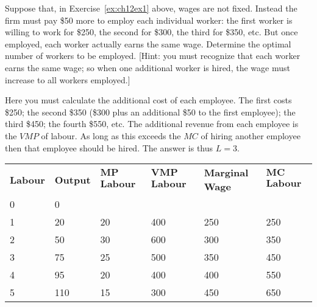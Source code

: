 \begin{enumialphparenastyle}
\begin{ex}\label{ex:ch12ex3}
Suppose that, in Exercise~\ref{ex:ch12ex1} above, wages are not fixed. Instead the firm must pay \$50 more to employ each individual worker: the first worker is willing to work for \$250, the second for \$300, the third for \$350, etc. But once employed, each worker actually earns the same wage.  Determine the optimal number of workers to be employed. [Hint: you must recognize that each worker earns the same wage; so when one additional worker is hired, the wage must increase to all workers employed.]
\begin{sol}
	Here you must calculate the additional cost of each employee. The first costs \$250; the second \$350 (\$300 plus an additional \$50 to the first employee); the third \$450; the fourth \$550, etc. The additional revenue from each employee is the $VMP$ of labour. As long as this exceeds the $MC$ of hiring another employee then that employee should be hired. The answer is thus $L=3$.
	\begin{center}
	\begin{tabu} to \linewidth {|X[0.5,c]X[0.5,c]X[0.8,c]X[1,c]X[1,c]X[1,c]|}	\hline
		\textbf{Labour}	&	\textbf{Output}	&	\textbf{$\mathbf{MP}$ Labour}	&	\textbf{$\mathbf{VMP}$ Labour}	&	\textbf{Marginal Wage}	&	\textbf{$\mathbf{MC}$ Labour}	\\
		0	&	0	&	&	&	&	\\
		1	&	20	&	20	&	400	&	250	&	250	\\
		2	&	50	&	30	&	600	&	300	&	350	\\
		3	&	75	&	25	&	500	&	350	&	450	\\
		4	&	95	&	20	&	400	&	400	&	550	\\
		5	&	110	&	15	&	300	&	450	&	650	\\	\hline
	\end{tabu}
	\end{center}
\end{sol}
\end{ex}


\end{enumialphparenastyle}
